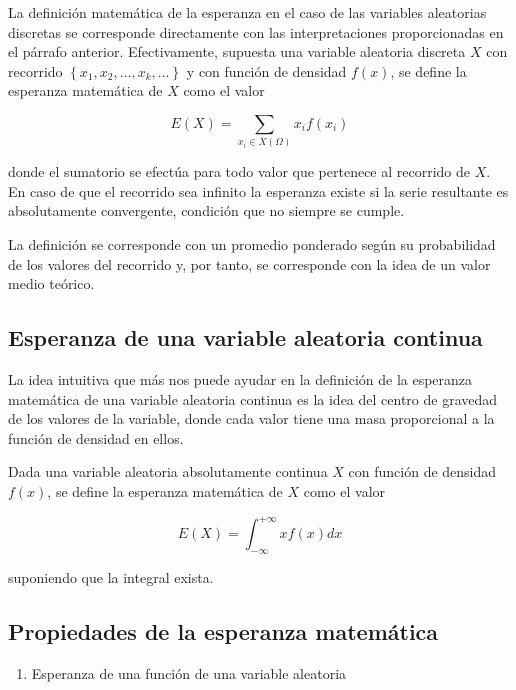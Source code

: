 \documentclass[
]{article}
\providecommand{\tightlist}{%
  \setlength{\itemsep}{0pt}\setlength{\parskip}{0pt}}
\begin{document}
La definición matemática de la esperanza en el caso de las variables
aleatorias discretas se corresponde directamente con las
interpretaciones proporcionadas en el párrafo anterior. Efectivamente,
supuesta una variable aleatoria discreta \(X\) con recorrido
\(\left\{x_{1}, x_{2}, \ldots, x_{k}, \ldots\right\}\) y con función de
densidad \(f(x)\), se define la esperanza matemática de \(X\) como el valor

\[
E(X)=\sum_{x_{i} \in X(\Omega)} x_{i} f\left(x_{i}\right)
\]

donde el sumatorio se efectúa para todo valor que pertenece al recorrido
de \(X\). En caso de que el recorrido sea infinito la esperanza existe si
la serie resultante es absolutamente convergente, condición que no
siempre se cumple.

La definición se corresponde con un promedio ponderado según su
probabilidad de los valores del recorrido y, por tanto, se corresponde
con la idea de un valor medio teórico.

\subsection{Esperanza de una variable aleatoria continua}\label{esperanza-de-una-variable-aleatoria-continua}

La idea intuitiva que más nos puede ayudar en la definición de la
esperanza matemática de una variable aleatoria continua es la idea del
centro de gravedad de los valores de la variable, donde cada valor tiene
una masa proporcional a la función de densidad en ellos.

Dada una variable aleatoria absolutamente continua \(X\) con función de
densidad \(f(x)\), se define la esperanza matemática de \(X\) como el valor

\[
E(X)=\int_{-\infty}^{+\infty} x f(x) d x
\]

suponiendo que la integral exista.

\subsection{Propiedades de la esperanza matemática}\label{propiedades-de-la-esperanza-matemuxe1tica}

\begin{enumerate}
\def\labelenumi{\arabic{enumi}.}
\tightlist
\item
  Esperanza de una función de una variable aleatoria
\end{enumerate}
\end{document}
